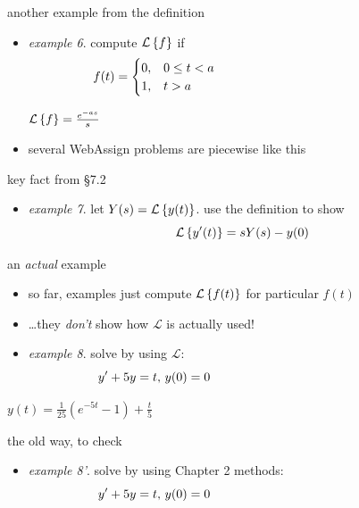 \documentclass[urlcolor=blue,dvipsnames]{beamer}
\begin{document}
\begin{frame}{another example from the definition}

\begin{itemize}
\item \emph{example 6}.  compute $\mathcal{L}\left\{f\right\}$ if
    $$f(t) = \begin{cases} 0, & 0 \le t < a \\
                           1, & t > a \end{cases} \hspace{50mm}$$

\vspace{35mm}
\hfill $\mathcal{L}\left\{f\right\} = \frac{e^{-as}}{s}$
\item several WebAssign problems are piecewise like this
\end{itemize}
\end{frame}


\begin{frame}{key fact from \S 7.2}

\begin{itemize}
\item \emph{example 7}.  let $Y(s) = \mathcal{L}\left\{y(t)\right\}$.  use the definition to show
    $$\mathcal{L}\left\{y'(t)\right\} = s Y(s) - y(0)$$

\vspace{50mm}
\end{itemize}
\end{frame}


\begin{frame}{an \emph{actual} example}

\begin{itemize}
\item so far, examples just compute $\mathcal{L}\left\{f(t)\right\}$ for particular $f(t)$
\item \dots they \emph{don't} show how $\mathcal{L}$ is actually used!
\item \emph{example 8}.  solve by using $\mathcal{L}$:
    $$y'+5y=t, \,y(0)=0 \hspace{50mm}$$
\end{itemize}

\vspace{40mm}
\hfill \footnotesize $y(t) = \frac{1}{25} (e^{-5t} - 1) + \frac{t}{5}$
\end{frame}


\begin{frame}{the old way, to check}

\begin{itemize}
\item \emph{example 8'}.  solve by using Chapter 2 methods:
    $$y'+5y=t, \,y(0)=0 \hspace{50mm}$$
\end{itemize}

\vspace{60mm}
\end{frame}
\end{document}

